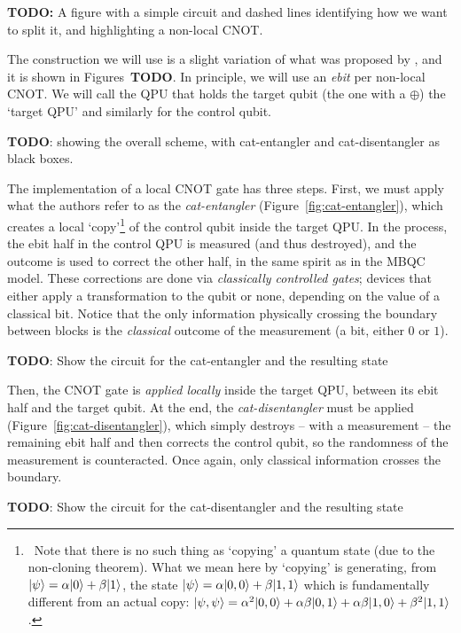 \textbf{TODO:} A figure with a simple circuit and dashed lines identifying how we want to split it, and highlighting a non-local CNOT.

The construction we will use is a slight variation of what was proposed by \citet{NonLocalCNOT}, and it is shown in Figures~\textbf{TODO}. In principle, we will use an \textit{ebit} per non-local CNOT. We will call the QPU that holds the target qubit (the one with a \(\oplus\)) the `target QPU' and similarly for the control qubit. 

\textbf{TODO}: showing the overall scheme, with cat-entangler and cat-disentangler as black boxes.

The implementation of a local CNOT gate has three steps. First, we must apply what the authors refer to as the \textit{cat-entangler} (Figure~\ref{fig:cat-entangler}), which creates a local `copy'\footnote{\, Note that there is no such thing as `copying' a quantum state (due to the non-cloning theorem). What we mean here by `copying' is generating, from \(\vert \psi \rangle = \alpha\vert 0 \rangle + \beta\vert 1 \rangle\), the state \(\vert \psi \rangle = \alpha\vert 0,0 \rangle + \beta\vert 1,1 \rangle\) which is fundamentally different from an actual copy: \(\vert \psi,\psi \rangle = \alpha^2\vert 0,0 \rangle + \alpha\beta\vert 0,1 \rangle + \alpha\beta\vert 1,0 \rangle + \beta^2\vert 1,1 \rangle\).} of the control qubit inside the target QPU. In the process, the ebit half in the control QPU is measured (and thus destroyed), and the outcome is used to correct the other half, in the same spirit as in the MBQC model. These corrections are done via \textit{classically controlled gates}; devices that either apply a transformation to the qubit or none, depending on the value of a classical bit. Notice that the only information physically crossing the boundary between blocks is the \textit{classical} outcome of the measurement (a bit, either \(0\) or \(1\)).

\textbf{TODO}: Show the circuit for the cat-entangler and the resulting state

Then, the CNOT gate is \textit{applied locally} inside the target QPU, between its ebit half and the target qubit. At the end, the \textit{cat-disentangler} must be applied (Figure~\ref{fig:cat-disentangler}), which simply destroys -- with a measurement -- the remaining ebit half and then corrects the control qubit, so the randomness of the measurement is counteracted. Once again, only classical information crosses the boundary.

\textbf{TODO}: Show the circuit for the cat-disentangler and the resulting state

